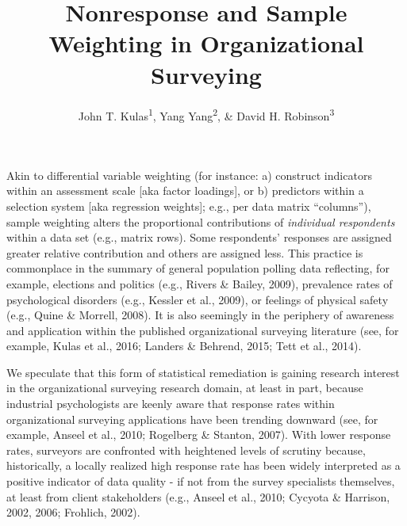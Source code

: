 \documentclass[
  man,mask]{apa7}
\title{Nonresponse and Sample Weighting in Organizational Surveying}
\author{John T. Kulas\textsuperscript{1}, Yang Yang\textsuperscript{2}, \& David H. Robinson\textsuperscript{3}}
\date{}
\affiliation{\vspace{0.5cm}\textsuperscript{1} Montclair State University\\\textsuperscript{2} Roche Group\\\textsuperscript{3} St.~Cloud State University}
\begin{document}
\maketitle

Akin to differential variable weighting (for instance: a) construct indicators within an assessment scale {[}aka factor loadings{]}, or b) predictors within a selection system {[}aka regression weights{]}; e.g., per data matrix ``columns''), sample weighting alters the proportional contributions of \emph{individual respondents} within a data set (e.g., matrix rows). Some respondents' responses are assigned greater relative contribution and others are assigned less. This practice is commonplace in the summary of general population polling data reflecting, for example, elections and politics (e.g., Rivers \& Bailey, 2009), prevalence rates of psychological disorders (e.g., Kessler et al., 2009), or feelings of physical safety (e.g., Quine \& Morrell, 2008). It is also seemingly in the periphery of awareness and application within the published organizational surveying literature (see, for example, Kulas et al., 2016; Landers \& Behrend, 2015; Tett et al., 2014).

We speculate that this form of statistical remediation is gaining research interest in the organizational surveying research domain, at least in part, because industrial psychologists are keenly aware that response rates within organizational surveying applications have been trending downward (see, for example, Anseel et al., 2010; Rogelberg \& Stanton, 2007). With lower response rates, surveyors are confronted with heightened levels of scrutiny because, historically, a locally realized high response rate has been widely interpreted as a positive indicator of data quality - if not from the survey specialists themselves, at least from client stakeholders (e.g., Anseel et al., 2010; Cycyota \& Harrison, 2002, 2006; Frohlich, 2002).
\end{document}
